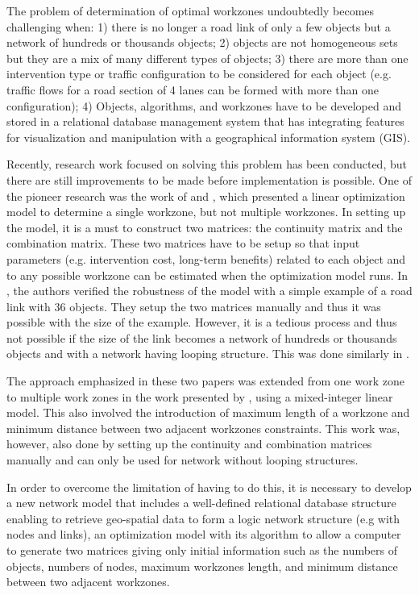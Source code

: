 \documentclass[a4paper,3p,times,authoryear]{elsarticle}
\begin{document}
The problem of determination of optimal workzones undoubtedly becomes
challenging when: 1) there is no longer a road link of only a few objects but a
network of hundreds or thousands objects; 2) objects are not homogeneous sets but
they are a mix of many different types of objects; 3) there are more than one
intervention type or traffic configuration to be considered for each object (e.g.
traffic flows for a road section of 4 lanes can be formed with more than one
configuration); 4) Objects, algorithms, and workzones have to be developed and stored in a relational database management system that has integrating features for visualization and manipulation with a geographical information system (GIS).

Recently, research work focused on solving this problem has been conducted, but
there are still improvements to be made before implementation is possible. One of
the pioneer research was the work of \cite{Hajdin2007} and \cite{Hajdin2005}, which presented a linear optimization model to determine a single workzone, but not multiple workzones. In setting up the model, it is a must to
construct two matrices: the continuity matrix and the combination matrix. These
two matrices have to be setup so that input parameters (e.g. intervention cost,
long-term benefits) related to each object and to any possible workzone can be
estimated when the optimization model runs. In \cite{Hajdin2007}, the
authors verified the robustness of the model with a simple example of a road link
with 36 objects. They setup the two matrices manually and thus it was possible
with the size of the example. However, it is a tedious process and thus not
possible if the size of the link becomes a network of hundreds or thousands
objects and with a network having looping structure. This was done similarly in
\cite{Hajdin2005}.

The approach emphasized in these two papers was extended from one work zone to
multiple work zones in the work presented by \cite{Lethanh2014b}, using a
mixed-integer linear model. This also involved the introduction of maximum length
of a workzone and minimum distance between two adjacent workzones constraints.
This work was, however, also done by setting up the continuity and combination
matrices manually and can only be used for network without looping structures.

In order to overcome the limitation of having to do this, it is necessary to develop a new network model that includes a well-defined relational database structure enabling to retrieve geo-spatial data to form a logic network structure (e.g with nodes and links), an optimization model with its algorithm to allow a computer to generate two matrices giving only initial information such as the numbers of objects, numbers of nodes, maximum workzones length, and minimum distance between two adjacent workzones. 
\end{document}
